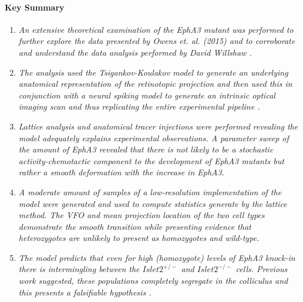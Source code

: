 \paragraph{Key Summary}
\begin{enumerate}
	\item \textit{An extensive theoretical examination of the EphA3 mutant was performed to further explore the data presented by Owens et. al. (2015) and to corroborate and understand the data analysis performed by David Willshaw  \cite{Willshaw2022-fs, Owens2015-zv}.}
	\item \textit{The analysis used the Tsigankov-Koulakov model to generate an underlying anatomical representation of the retinotopic projection and then used this in conjunction with a neural spiking model to generate an intrinsic optical imaging scan and thus replicating the entire experimental pipeline \cite{Kalatsky2003-cz, Owens2015-zv}.}
	\item \textit{Lattice analysis and anatomical tracer injections were performed revealing the model adequately explains experimental observations. A parameter sweep of the amount of EphA3 revealed that there is not likely to be a stochastic activity-chemotactic component to the development of EphA3 mutants but rather a smooth deformation with the increase in EphA3}.
	\item \textit{A moderate amount of samples of a low-resolution implementation of the model were generated and used to compute statistics generate by the lattice method. The VFO and mean projection location of the two cell types demonstrate the smooth transition while presenting evidence that heterozygotes are unlikely to present as homozygotes and wild-type.}
	\item \textit{The model predicts that even for high (homozygote) levels of EphA3 knock-in there is intermingling between the $Islet2^{+/-}$ and $Islet2^{-/-}$ cells. Previous work suggested, these populations completely segregate in the colliculus and this presents a falsifiable hypothesis \cite{Cang2013-dw}.}
\end{enumerate}